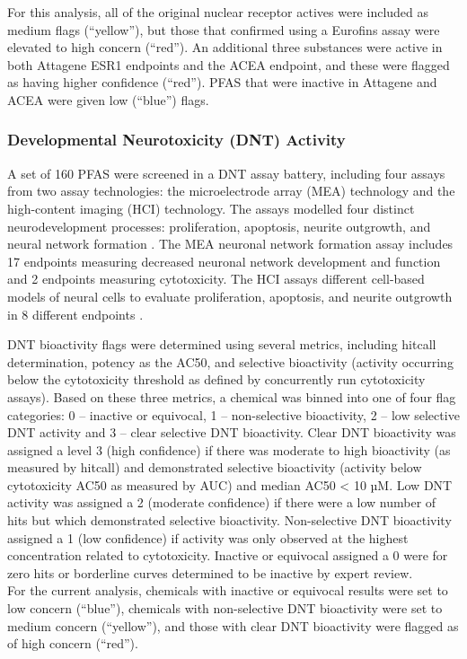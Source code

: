 \documentclass[
  super,
  preprint,
  3p]{elsarticle}
\begin{document}
For this analysis, all of the original nuclear receptor actives were
included as medium flags (``yellow''), but those that confirmed using a
Eurofins assay were elevated to high concern (``red''). An additional
three substances were active in both Attagene ESR1 endpoints and the
ACEA endpoint, and these were flagged as having higher confidence
(``red''). PFAS that were inactive in Attagene and ACEA were given low
(``blue'') flags.

\hypertarget{developmental-neurotoxicity-dnt-activity}{%
\subsubsection{Developmental Neurotoxicity (DNT)
Activity}\label{developmental-neurotoxicity-dnt-activity}}

A set of 160 PFAS were screened in a DNT assay battery, including four
assays from two assay technologies: the microelectrode array (MEA)
technology and the high-content imaging (HCI) technology. The assays
modelled four distinct neurodevelopment processes: proliferation,
apoptosis, neurite outgrowth, and neural network formation
\citep{carstens_evaluation_2023}. The MEA neuronal network formation
assay includes 17 endpoints measuring decreased neuronal network
development and function and 2 endpoints measuring cytotoxicity. The HCI
assays different cell-based models of neural cells to evaluate
proliferation, apoptosis, and neurite outgrowth in 8 different endpoints
\citep{carstens_evaluation_2023}.

DNT bioactivity flags were determined using several metrics, including
hitcall determination, potency as the AC50, and selective bioactivity
(activity occurring below the cytotoxicity threshold as defined by
concurrently run cytotoxicity assays). Based on these three metrics, a
chemical was binned into one of four flag categories: 0 -- inactive or
equivocal, 1 -- non-selective bioactivity, 2 -- low selective DNT
activity and 3 -- clear selective DNT bioactivity. Clear DNT bioactivity
was assigned a level 3 (high confidence) if there was moderate to high
bioactivity (as measured by hitcall) and demonstrated selective
bioactivity (activity below cytotoxicity AC50 as measured by AUC) and
median AC50 \textless{} 10 µM. Low DNT activity was assigned a 2
(moderate confidence) if there were a low number of hits but which
demonstrated selective bioactivity. Non-selective DNT bioactivity
assigned a 1 (low confidence) if activity was only observed at the
highest concentration related to cytotoxicity. Inactive or equivocal
assigned a 0 were for zero hits or borderline curves determined to be
inactive by expert review.\\
For the current analysis, chemicals with inactive or equivocal results
were set to low concern (``blue''), chemicals with non-selective DNT
bioactivity were set to medium concern (``yellow''), and those with
clear DNT bioactivity were flagged as of high concern (``red'').
\end{document}

